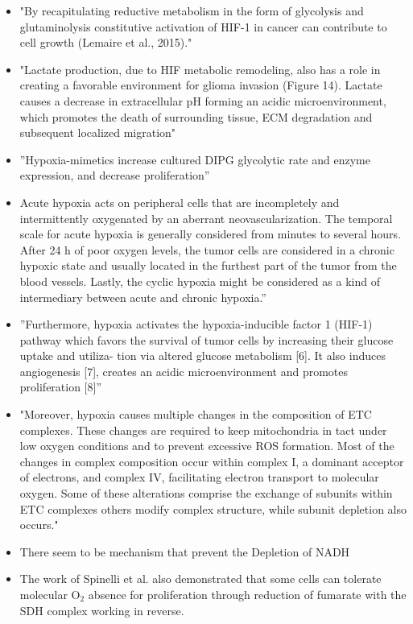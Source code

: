 \documentclass[11pt,a4paper]{article}
\begin{document}
\begin{itemize}
\item "By recapitulating reductive metabolism in the form of glycolysis and glutaminolysis constitutive activation of HIF-1 in cancer can contribute to cell growth (Lemaire et al., 2015)." \cite{Strickland2017}
\item "Lactate production, due to HIF metabolic remodeling, also
has a role in creating a favorable environment for glioma
invasion (Figure 14). Lactate causes a decrease in extracellular pH forming an acidic microenvironment, which promotes the death of surrounding tissue, ECM degradation and subsequent localized migration" \cite{Strickland2017}
\item ”Hypoxia-mimetics increase cultured DIPG glycolytic rate and enzyme expression, and decrease proliferation” \cite{Waker2018}
\item Acute hypoxia acts on peripheral cells that are incompletely and intermittently oxygenated by an aberrant neovascularization. The temporal scale for acute hypoxia is generally considered from minutes to several hours. After 24 h of poor oxygen levels, the tumor cells are considered in a chronic hypoxic state and usually located in the furthest part of the tumor from the blood vessels. Lastly, the cyclic hypoxia might be considered as a kind of intermediary between acute and chronic hypoxia.”\cite{Fuchs2020}
\item ”Furthermore, hypoxia activates the hypoxia-inducible factor 1 (HIF-1) pathway which favors the survival of tumor cells by increasing their glucose uptake and utiliza-
tion via altered glucose metabolism [6]. It also induces angiogenesis [7], creates an acidic microenvironment and promotes proliferation [8]”\cite{Shen2018}
\item "Moreover, hypoxia causes multiple changes in the
composition of ETC complexes. These changes are required to keep mitochondria in tact under low oxygen conditions and to prevent excessive ROS formation. Most of the changes in complex composition occur within complex I, a dominant acceptor of electrons, and complex IV, facilitating electron transport to molecular oxygen. Some of these alterations comprise the exchange of subunits within ETC complexes others modify complex structure, while subunit depletion also occurs." \cite{Fuhrmann2017}
\item There seem to be mechanism that prevent the Depletion of NADH \cite{Yan2020}
\item The work of Spinelli et al. also demonstrated that some cells can tolerate molecular O$_{2}$ absence for proliferation through reduction of fumarate with the SDH complex working in reverse. \cite{Spinelli2021}
\end{itemize}
\end{document}
